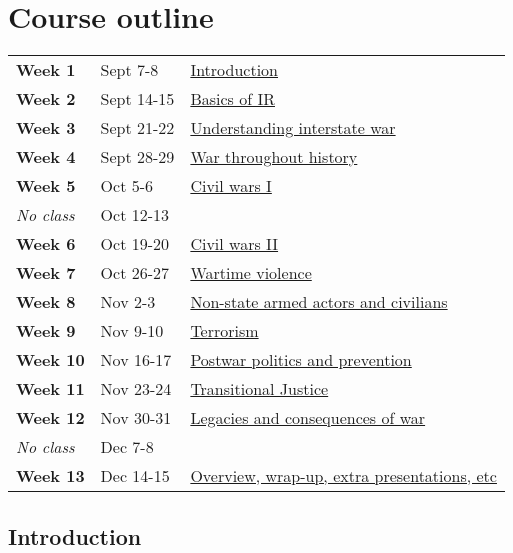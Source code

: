 \documentclass[12pt, a4paper]{article}
\begin{document}
\newpage
\section{Course outline}

\begin{table*}[!ht]
  \centering

  \begin{tabular}{lll}
    \textbf{Week 1} & Sept 7-8   & \hyperref[intro]{Introduction} \\
    \textbf{Week 2} & Sept 14-15 & \hyperref[ir_basics]{Basics of IR} \\
    \textbf{Week 3} & Sept 21-22 & \hyperref[interstate]{Understanding interstate war} \\
    \textbf{Week 4} & Sept 28-29 & \hyperref[war_history]{War throughout history} \\
    \textbf{Week 5} & Oct 5-6    & \hyperref[cw1]{Civil wars I} \\
    \textit{No class} & Oct 12-13  &\\
    \textbf{Week 6} & Oct 19-20  & \hyperref[cw2]{Civil wars II} \\
    \textbf{Week 7} & Oct 26-27  & \hyperref[wartime_violence]{Wartime violence} \\
    \textbf{Week 8} & Nov 2-3    & \hyperref[rebels]{Non-state armed actors and civilians} \\
    \textbf{Week 9} & Nov 9-10   & \hyperref[rebels]{Terrorism} \\
    \textbf{Week 10} & Nov 16-17  & \hyperref[terrorism]{Postwar politics and prevention}  \\
    \textbf{Week 11} & Nov 23-24  & \hyperref[postwar]{Transitional Justice} \\
    \textbf{Week 12} & Nov 30-31  & \hyperref[tj]{Legacies and consequences of war} \\
    \textit{No class} & Dec 7-8    &\\
    \textbf{Week 13} & Dec 14-15  & \hyperref[wrap_up]{Overview, wrap-up, extra presentations, etc} \\
  \end{tabular}
\end{table*}




\hline %

\subsection{Introduction} \label{intro}
\end{document}
